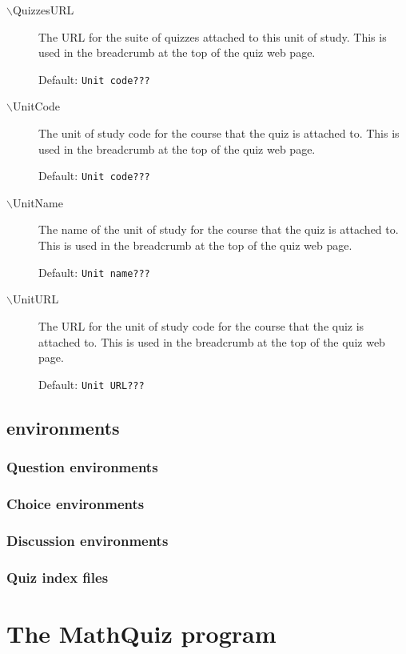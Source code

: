 \documentclass[svgnames]{article}
\begin{document}
\begin{description}
  \item[$\backslash$QuizzesURL]
    The URL for the suite of quizzes attached to this unit of study. This
    is used in the breadcrumb at the top of the quiz web page.

    Default: \texttt{Unit code???}

  \item[$\backslash$UnitCode]
    The unit of study code for the course that the quiz is attached
    to. This is used in the breadcrumb at the top of the quiz web page.

    Default: \texttt{Unit code???}

  \item[$\backslash$UnitName]
    The name of the unit of study for the course that the quiz is attached
    to. This is used in the breadcrumb at the top of the quiz web page.

    Default: \texttt{Unit name???}

  \item[$\backslash$UnitURL]
    The URL for the unit of study code for the course that the quiz is attached
    to. This is used in the breadcrumb at the top of the quiz web page.

    Default: \texttt{Unit URL???}

\end{description}

\subsection{\MathQuiz environments }

\subsubsection{Question environments}
\subsubsection{Choice environments}
\subsubsection{Discussion environments}
\subsubsection{Quiz index files}

\section{The MathQuiz program}
\end{document}
